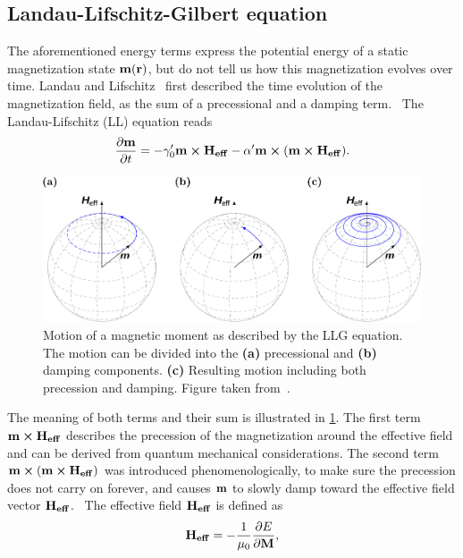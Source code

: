 \documentclass[11pt,a4paper,english]{article}
\begin{document}
\subsection{Landau-Lifschitz-Gilbert equation}
The aforementioned energy terms express the potential energy of a static magnetization state $\vb{m}(\vb{r})$, but do not tell us how this magnetization evolves over time. Landau and Lifschitz~\cite{lifdau} first described the time evolution of the magnetization field, as the sum of a precessional and a damping term.~\cite{abert2013discrete, NML_Carlton, phd_leliaert} The Landau-Lifschitz (LL) equation reads
\begin{equation}
    \frac{\partial \vb{m}}{\partial t} = - \gamma_0' \vb{m} \cross \vb{H_{eff}} - \alpha' \vb{m} \cross (\vb{m} \cross \vb{H_{eff}}) \mathrm{.}
    \label{eq:LL}
\end{equation}
\begin{figure}
    \centering
    \includegraphics[width=0.9\columnwidth]{Figures/Introduction/abert2013discrete - Figure 2.2.pdf}
    \caption{Motion of a magnetic moment as described by the LLG equation. The motion can be divided into the \textbf{(a)} precessional and \textbf{(b)} damping components. \textbf{(c)} Resulting motion including both precession and damping. Figure taken from~\cite{abert2013discrete}.}
    \label{fig:LLG_motion_Heff}
\end{figure}
\par The meaning of both terms and their sum is illustrated in \cref{fig:LLG_motion_Heff}. The first term $\vb{m} \cross \vb{H_{eff}}$ describes the precession of the magnetization around the effective field and can be derived from quantum mechanical considerations. The second term $\vb{m} \cross (\vb{m} \cross \vb{H_{eff}})$ was introduced phenomenologically, to make sure the precession does not carry on forever, and causes $\vb{m}$ to slowly damp toward the effective field vector $\vb{H_{eff}}$.~\cite{NML_Carlton} The effective field $\vb{H_{eff}}$ is defined as
\begin{equation}
	\vb{H_{eff}} = - \frac{1}{\mu_0} \frac{\partial E}{\partial \vb{M}} \mathrm{,}
	\label{eq:H_eff}
\end{equation}
\end{document}
